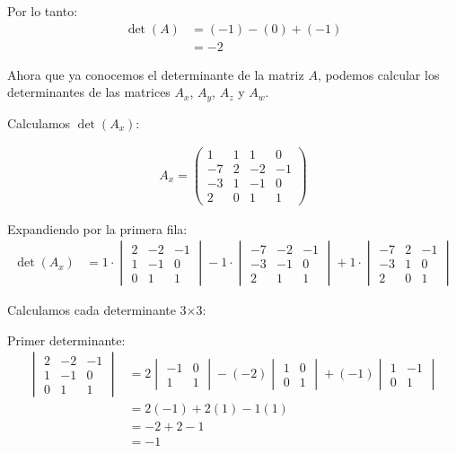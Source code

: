 \documentclass{article}
\begin{document}
Por lo tanto:
\begin{align}
    \det(A) &= (-1) - (0) + (-1) \\
    &= -2
\end{align}

Ahora que ya conocemos el determinante de la matriz $A$, podemos calcular los determinantes de las matrices $A_x$, $A_y$, $A_z$ y $A_w$.

Calculamos $\det(A_x)$:

\begin{align}
    A_x = \begin{pmatrix}
    1 & 1 & 1 & 0 \\
    -7 & 2 & -2 & -1 \\
    -3 & 1 & -1 & 0 \\
    2 & 0 & 1 & 1
    \end{pmatrix}
\end{align}

Expandiendo por la primera fila:
\begin{align}
    \det(A_x) &= 1 \cdot \begin{vmatrix} 2 & -2 & -1 \\ 1 & -1 & 0 \\ 0 & 1 & 1 \end{vmatrix} - 1 \cdot \begin{vmatrix} -7 & -2 & -1 \\ -3 & -1 & 0 \\ 2 & 1 & 1 \end{vmatrix} + 1 \cdot \begin{vmatrix} -7 & 2 & -1 \\ -3 & 1 & 0 \\ 2 & 0 & 1 \end{vmatrix}
\end{align}

Calculamos cada determinante 3×3:

Primer determinante:
\begin{align}
    \begin{vmatrix} 2 & -2 & -1 \\ 1 & -1 & 0 \\ 0 & 1 & 1 \end{vmatrix} &= 2 \begin{vmatrix} -1 & 0 \\ 1 & 1 \end{vmatrix} - (-2) \begin{vmatrix} 1 & 0 \\ 0 & 1 \end{vmatrix} + (-1) \begin{vmatrix} 1 & -1 \\ 0 & 1 \end{vmatrix} \\
    &= 2(-1) + 2(1) - 1(1) \\
    &= -2 + 2 - 1 \\
    &= -1
\end{align}
\end{document}
